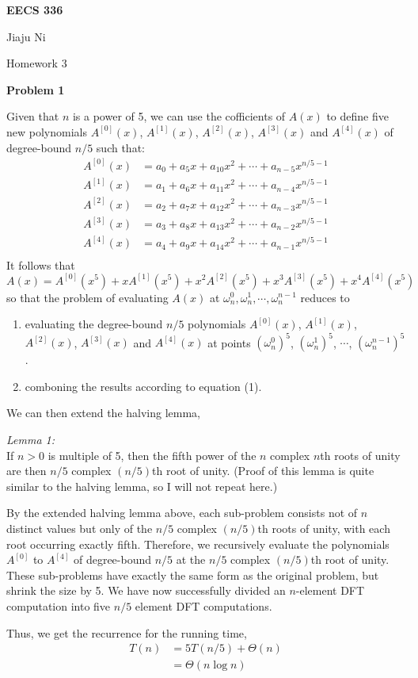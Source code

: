 \documentclass[12pt,letterpaper]{article}
\def\pp{\par\noindent}
\newcommand{\problem}[1]{ \bigskip \pp \textbf{Problem #1}\par}
\newcommand{\lemma}[1]{\medskip\pp\textit{Lemma #1:}}
\begin{document}
\centerline{\bf EECS 336}

\medskip
\centerline{Jiaju Ni}
\centerline{Homework 3}
\bigskip


\problem{1}
Given that $n$ is a power of 5, we can use the cofficients of $A(x)$ to define five new polynomials $A^{[0]}(x)$, $A^{[1]}(x)$, $A^{[2]}(x)$, $A^{[3]}(x)$ and $A^{[4]}(x)$ of degree-bound $n/5$ such that:
\begin{align*}
	A^{[0]}(x)&=a_0+a_5x+a_{10}x^2+\cdots+a_{n-5}x^{n/5-1}\\
	A^{[1]}(x)&=a_1+a_6x+a_{11}x^2+\cdots+a_{n-4}x^{n/5-1}\\
	A^{[2]}(x)&=a_2+a_7x+a_{12}x^2+\cdots+a_{n-3}x^{n/5-1}\\
	A^{[3]}(x)&=a_3+a_8x+a_{13}x^2+\cdots+a_{n-2}x^{n/5-1}\\
	A^{[4]}(x)&=a_4+a_9x+a_{14}x^2+\cdots+a_{n-1}x^{n/5-1}\\
\end{align*}
It follows that
\begin{equation}
	A(x)=A^{[0]}(x^5)+xA^{[1]}(x^5)+x^2A^{[2]}(x^5)+x^3A^{[3]}(x^5)+x^4A^{[4]}(x^5)
\end{equation}
so that the problem of evaluating $A(x)$ at $\omega_n^0, \omega_n^1, \cdots, \omega_n^{n-1}$ reduces to 
\begin{enumerate}
	\item evaluating the degree-bound $n/5$ polynomials $A^{[0]}(x)$, $A^{[1]}(x)$, $A^{[2]}(x)$, $A^{[3]}(x)$ and $A^{[4]}(x)$ at points $(\omega_n^0)^5$, $(\omega_n^1)^5$, $\cdots$, $(\omega_n^{n-1})^5$.
	\item comboning the results according to equation (1).
\end{enumerate}
We can then extend the halving lemma,
\lemma{1}\\
If $n>0$ is multiple of 5, then the fifth power of the $n$ complex $n$th roots of unity are then $n/5$ complex $(n/5)$th root of unity. (Proof of this lemma is quite similar to the halving lemma, so I will not repeat here.)\par
By the extended halving lemma above, each sub-problem consists not of $n$ distinct values but only of the $n/5$ complex $(n/5)$th roots of unity, with each root occurring exactly fifth. Therefore, we recursively evaluate the polynomials $A^{[0]}$ to $A^{[4]}$ of degree-bound $n/5$ at the $n/5$ complex $(n/5)$th root of unity. These sub-problems have exactly the same form as the original problem, but shrink the size by 5. We have now successfully divided an $n$-element DFT computation into five $n/5$ element DFT computations.\par
Thus, we get the recurrence for the running time,
\begin{align*}
	T(n)&=5T(n/5)+\Theta(n)\\
	&=\Theta(n\log n)
\end{align*}
\end{document}
